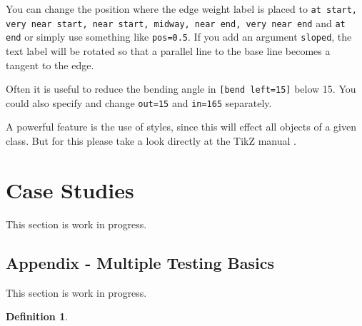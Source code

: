 \documentclass[a4paper, 11pt]{article}
\numberwithin{equation}{section}
\theoremstyle{definition}
\newtheorem{Def}{Definition}[section]
\theoremstyle{plain}
\begin{document}
You can change the position where the edge weight label is placed to
\texttt{at start, very near start, near start, midway, near end, very
  near end} and \texttt{at end} or simply use something like
\texttt{pos=0.5}.  If you add an argument \texttt{sloped}, the text
label will be rotated so that a parallel line to the base line becomes
a tangent to the edge.

Often it is useful to reduce the bending angle in \texttt{[bend
    left=15]} below 15. You could also specify and change
\texttt{out=15} and \texttt{in=165} separately.

A powerful feature is the use of styles, since this will effect all
objects of a given class. But for this please take a look directly at
the TikZ manual \cite{TikZ}.

\section{Case Studies}\label{caseStudies}

This section is work in progress.

\begin{appendix} 

\section{Appendix - Multiple Testing Basics}

This section is work in progress.

\begin{Def}

\end{Def}

\end{appendix}

\newpage

\printindex

\newpage


\end{document}
